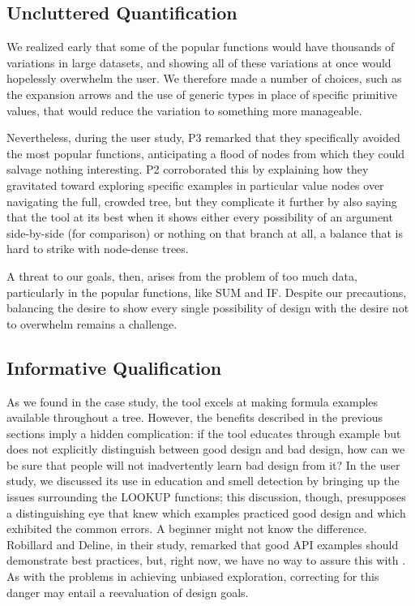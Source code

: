 \documentclass[conference]{IEEEtran}
\begin{document}
	\subsection{Uncluttered Quantification}
	
	We realized early that some of the popular functions would have thousands of variations in large datasets, and showing all of
	these variations at once would hopelessly overwhelm the user. We therefore made
	a number of choices, such as the expansion arrows and the use of generic types
	in place of specific primitive values, that would reduce the variation to
	something more manageable.
	
	Nevertheless, during the user study, P3 remarked that they specifically avoided
	the most popular functions, anticipating a flood of nodes from which they could
	salvage nothing interesting. P2 corroborated this by explaining how they
	gravitated toward exploring specific examples in particular value nodes over
	navigating the full, crowded tree, but they complicate it further by also
	saying that the tool at its best when it shows either every possibility of an
	argument side-by-side (for comparison) or nothing on that branch at all, a
	balance that is hard to strike with node-dense trees.
	
	A threat to our goals, then, arises from the problem of too much data,
	particularly in the popular functions, like SUM and IF. Despite our
	precautions, balancing the desire to show every single possibility of design
	with the desire not to overwhelm remains a challenge. \par
	
	\subsection{Informative Qualification} As we found in the case study, the tool
	excels at making formula examples available throughout a tree. 	
	However, the benefits described in the previous sections imply a hidden
	complication: if the tool educates through example but does not explicitly
	distinguish between good design and bad design, how can we be sure that people
	will not inadvertently learn bad design from it? In the user study, we
	discussed its use in education and smell detection by bringing up the issues
	surrounding the LOOKUP functions; this discussion, though, presupposes a
	distinguishing eye that knew which examples practiced good design and which
	exhibited the common errors. A beginner might not know the difference.
	Robillard and Deline, in their study, remarked that good API examples should
	demonstrate best practices, but, right now, we have no way to assure this with
	\toolnameend. As with the problems in achieving unbiased exploration, correcting
	for this danger may entail a reevaluation of design goals.
	
\end{document}
